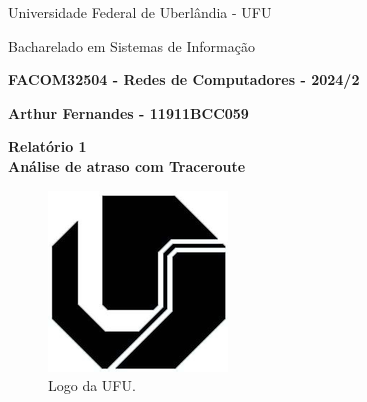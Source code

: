\documentclass[12pt,a4paper]{report}
\begin{document}
	\begin{center}
		{\Large Universidade Federal de Uberlândia - UFU}
		
		Bacharelado em Sistemas de Informação
		
		\textbf{FACOM32504 - Redes de Computadores - 2024/2}
		
		\textbf{Arthur Fernandes - 11911BCC059}
	\end{center}
	
	\vspace{10pt}

	\begin{center}
		{\LARGE \textbf{Relatório 1 \\ \vspace{10pt} Análise de atraso com Traceroute}}
	\end{center}
	
	\vspace{10pt}
	
	\begin{figure}[ht]
		\centering
		\includegraphics[scale=1]{ufu.png}
		\caption{Logo da UFU.}
		\label{fig:logoUFU1}
	\end{figure}
\end{document}
